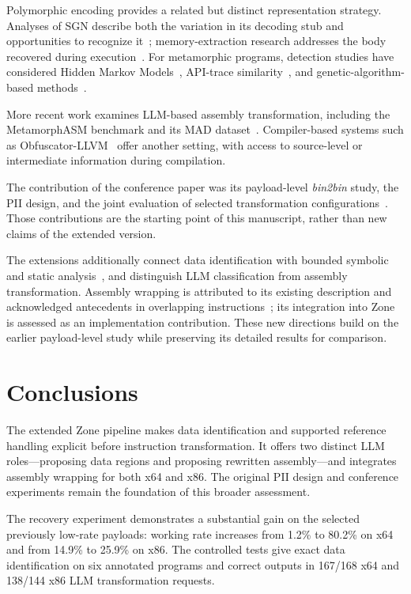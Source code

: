 \documentclass[runningheads]{llncs}
\begin{document}
Polymorphic encoding provides a related but distinct representation strategy. Analyses of SGN describe both the variation in its decoding stub and opportunities to recognize it~\cite{sgn64,sgnstrong}; memory-extraction research addresses the body recovered during execution~\cite{codeExtraction}. For metamorphic programs, detection studies have considered Hidden Markov Models~\cite{wong2006hunting,desai2010highly}, API-trace similarity~\cite{identifyingmeth}, and genetic-algorithm-based methods~\cite{methgenetic}.

More recent work examines LLM-based assembly transformation, including the MetamorphASM benchmark and its MAD dataset~\cite{llmobf,llm2}. Compiler-based systems such as Obfuscator-LLVM~\cite{llvmobf} offer another setting, with access to source-level or intermediate information during compilation.

The contribution of the conference paper was its payload-level \emph{bin2bin} study, the PII design, and the joint evaluation of selected transformation configurations~\cite{zone_secrypt_2026}. Those contributions are the starting point of this manuscript, rather than new claims of the extended version.


The extensions additionally connect data identification with bounded
symbolic and static analysis~\cite{angr_cfg_docs}, and distinguish LLM
classification from assembly transformation. Assembly wrapping is
attributed to its existing description and acknowledged antecedents
in overlapping instructions~\cite{assembly_wrapping}; its integration
into Zone is assessed as an implementation contribution. These new
directions build on the earlier payload-level study while preserving
its detailed results for comparison.

\section{Conclusions}\label{sec:conclusion3}
The extended Zone pipeline makes data identification and supported
reference handling explicit before instruction transformation. It offers
two distinct LLM roles---proposing data regions and proposing rewritten
assembly---and integrates assembly wrapping for both x64 and x86.
The original PII design and conference experiments remain the foundation
of this broader assessment.

The recovery experiment demonstrates a substantial gain on the selected
previously low-rate payloads: working rate increases from 1.2\% to 80.2\%
on x64 and from 14.9\% to 25.9\% on x86. The controlled tests give exact
data identification on six annotated programs and correct outputs in
167/168 x64 and 138/144 x86 LLM transformation requests.
\end{document}
